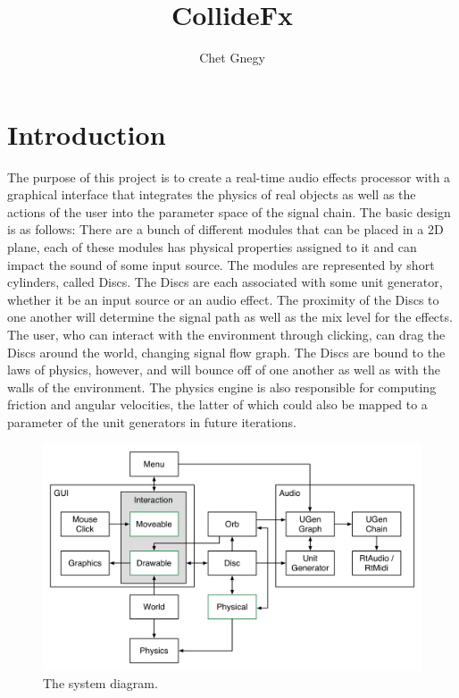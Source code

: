 \documentclass[pdftext,twoside,10pt]{article}
\title{CollideFx}
\author{Chet Gnegy}
\begin{document}
\maketitle

\section{Introduction}
The purpose of this project is to create a real-time audio effects processor with a graphical interface that integrates the physics of real objects as well as the actions of the user into the parameter space of the signal chain. The basic design is as follows: There are a bunch of different modules that can be placed in a 2D plane, each of these modules has physical properties assigned to it and can impact the sound of some input source. The modules are represented by short cylinders, called Discs. The Discs are each associated with some unit generator, whether it be an input source or an audio effect. The proximity of the Discs to one another will determine the signal path as well as the mix level for the effects. The user, who can interact with the environment through clicking, can drag the Discs around the world, changing signal flow graph. The Discs are bound to the laws of physics, however, and will bounce off of one another as well as with the walls of the environment. The physics engine is also responsible for computing friction and angular velocities, the latter of which could also be mapped to a parameter of the unit generators in future iterations.


\begin{figure}[b!]
  \centering
    \includegraphics[width=\textwidth]{flow.png}
    \caption{The system diagram.}
  
\end{figure}
\end{document}
